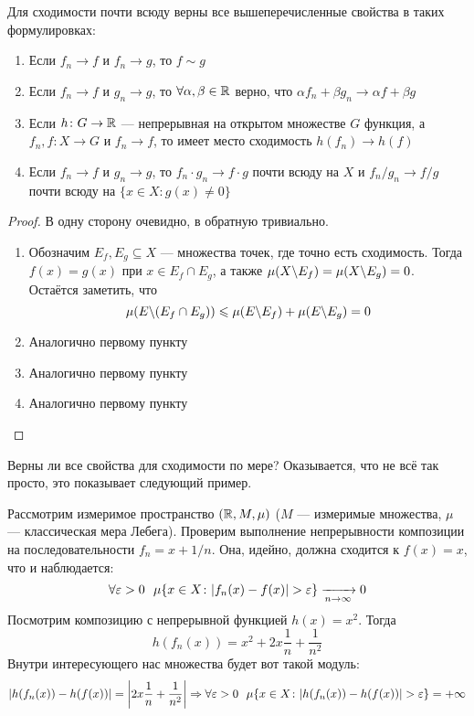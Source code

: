 \begin{theorem}
	Для сходимости почти всюду верны все вышеперечисленные свойства в таких формулировках:
	\begin{enumerate}
		\item Если $f_n \to f$ и $f_n \to g$, то $f \sim g$
		
		\item Если $f_n \to f$ и $g_n \to g$, то $\forall \alpha, \beta \in \mathbb{R}$ верно, что $\alpha f_n + \beta g_n \to \alpha f + \beta g$
		
		\item Если $h \colon G \to \mathbb{R}$ --- непрерывная на открытом множестве $G$ функция, а $f_n, f \colon X \to G$ и $f_n \to f$, то имеет место сходимость $h(f_n) \to h(f)$
		
		\item Если $f_n \to f$ и $g_n \to g$, то $f_n \cdot g_n \to f \cdot g$ почти всюду на $X$ и $f_n / g_n \to f / g$ почти всюду на $\{x \in X \colon g(x) \neq 0\}$
	\end{enumerate}
\end{theorem}

\begin{proof}
	В одну сторону очевидно, в обратную тривиально.
	\begin{enumerate}
		\item Обозначим $E_f, E_g \subseteq X$ --- множества точек, где точно есть сходимость. Тогда $f(x) = g(x)$ при $x \in E_f \cap E_g$, а также $\mu(X \backslash E_f) = \mu(X \backslash E_g) = 0$. Остаётся заметить, что
		\[
			\mu(E \backslash (E_f \cap E_g)) \leqslant \mu(E \backslash E_f) + \mu(E \backslash E_g) = 0
		\]
		
		\item Аналогично первому пункту
		
		\item Аналогично первому пункту
		
		\item Аналогично первому пункту
	\end{enumerate}
\end{proof}

\begin{note}
	Верны ли все свойства для сходимости по мере? Оказывается, что не всё так просто, это показывает следующий пример.	
\end{note}

\begin{example}
	Рассмотрим измеримое пространство $(\mathbb{R}, M, \mu)$ ($M$ --- измеримые множества, $\mu$ --- классическая мера Лебега). Проверим выполнение непрерывности композиции на последовательности $f_n = x + 1 / n$. Она, идейно, должна сходится к $f(x) = x$, что и наблюдается:
	\[
		\forall \eps > 0\ \ \mu\{x \in X \colon |f_n(x) - f(x)| > \eps\} \xrightarrow[n \to \infty]{} 0
	\]
	Посмотрим композицию с непрерывной функцией $h(x) = x^2$. Тогда
	\[
		h(f_n(x)) = x^2 + 2x\frac{1}{n} + \frac{1}{n^2}
	\]
	Внутри интересующего нас множества будет вот такой модуль:
	\[
		|h(f_n(x)) - h(f(x))| = \left|2x\frac{1}{n} + \frac{1}{n^2}\right| \Rightarrow \forall \varepsilon > 0\ \ \mu\{x \in X \colon |h(f_n(x)) - h(f(x))| > \varepsilon\} = +\infty
	\]
\end{example}

